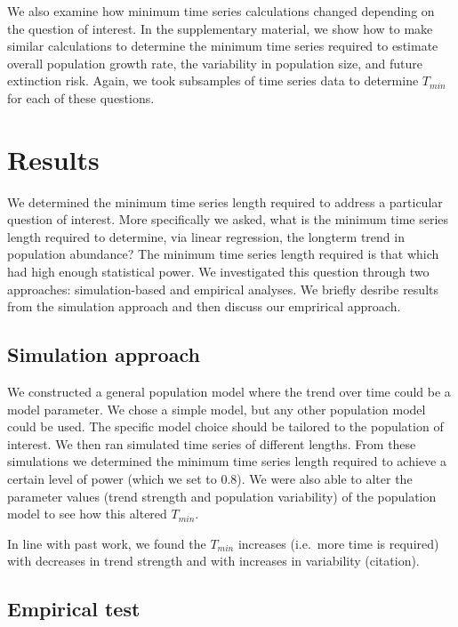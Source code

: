 \documentclass[12pt,]{article}
\begin{document}
We also examine how minimum time series calculations changed depending
on the question of interest. In the supplementary material, we show how
to make similar calculations to determine the minimum time series
required to estimate overall population growth rate, the variability in
population size, and future extinction risk. Again, we took subsamples
of time series data to determine \(T_{min}\) for each of these
questions.

\section{Results}\label{results}

We determined the minimum time series length required to address a
particular question of interest. More specifically we asked, what is the
minimum time series length required to determine, via linear regression,
the longterm trend in population abundance? The minimum time series
length required is that which had high enough statistical power. We
investigated this question through two approaches: simulation-based and
empirical analyses. We briefly desribe results from the simulation
approach and then discuss our emprirical approach.

\subsection{Simulation approach}\label{simulation-approach-1}

We constructed a general population model where the trend over time
could be a model parameter. We chose a simple model, but any other
population model could be used. The specific model choice should be
tailored to the population of interest. We then ran simulated time
series of different lengths. From these simulations we determined the
minimum time series length required to achieve a certain level of power
(which we set to 0.8). We were also able to alter the parameter values
(trend strength and population variability) of the population model to
see how this altered \(T_{min}\).

In line with past work, we found the \(T_{min}\) increases (i.e.~more
time is required) with decreases in trend strength and with increases in
variability (citation).

\subsection{Empirical test}\label{empirical-test}
\end{document}
